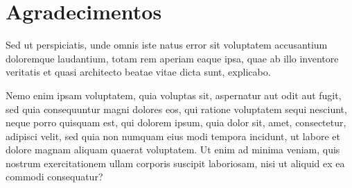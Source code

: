 \newpage


\chapter*{Agradecimentos}
\thispagestyle{empty}


Sed ut perspiciatis, unde omnis iste natus error sit voluptatem accusantium doloremque laudantium, totam rem aperiam eaque ipsa, quae ab illo inventore veritatis et quasi architecto beatae vitae dicta sunt, explicabo.

Nemo enim ipsam voluptatem, quia voluptas sit, aspernatur aut odit aut fugit, sed quia consequuntur magni dolores eos, qui ratione voluptatem sequi nesciunt, neque porro quisquam est, qui dolorem ipsum, quia dolor sit, amet, consectetur, adipisci velit, sed quia non numquam eius modi tempora incidunt, ut labore et dolore magnam aliquam quaerat voluptatem. Ut enim ad minima veniam, quis nostrum exercitationem ullam corporis suscipit laboriosam, nisi ut aliquid ex ea commodi consequatur?

